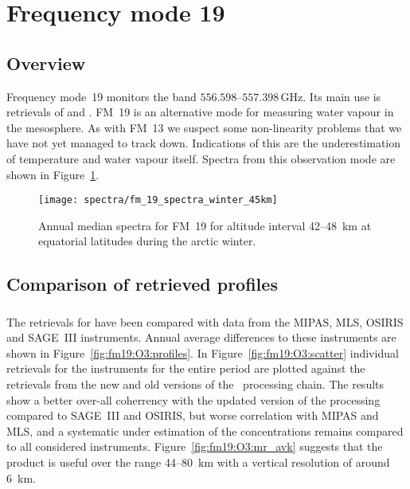 \section{Frequency mode 19}
\label{sec:fm19}

\subsection{Overview}
\label{sec:fm19:overview}
Frequency mode~19 monitors the band $556.598$--$557.398\,\mathrm{GHz}$. Its
main use is retrievals of  and .
FM~19 is an alternative mode for measuring water vapour in the mesosphere. As
with FM~13 we suspect some non-linearity problems that we have not yet managed
to track down.  Indications of this are the underestimation of temperature and
water vapour itself.
Spectra from this observation mode are shown in Figure~\ref{fig:spectra:19}.

\begin{figure}[ht]
    \centering
    \texttt{[image: spectra/fm\_19\_spectra\_winter\_45km]}
    \caption{Annual median spectra for FM~19 for altitude interval 42--48~km at
        equatorial latitudes during the arctic winter.
    }\label{fig:spectra:19}
\end{figure}


\subsection{Comparison of retrieved profiles}
\label{sec:fm19:comparison}



\subsubsection{}
\label{sec:fm19:comparison:O3}
The retrievals for  have been compared with data from the MIPAS, MLS,
OSIRIS and SAGE~III instruments. Annual average differences to these
instruments are shown in Figure~\ref{fig:fm19:O3:profiles}. In
Figure~\ref{fig:fm19:O3:scatter} individual retrievals for the instruments for
the entire period are plotted against the retrievals from the new and old
versions of the \smr\ processing chain. The results show a better over-all
coherrency with the updated version of the processing compared to SAGE~III and
OSIRIS, but worse correlation with MIPAS and MLS, and a systematic under
estimation of the concentrations remains compared to all considered
instruments.
Figure~\ref{fig:fm19:O3:mr_avk} suggests that the product is useful over the
range 44--80~km with a vertical resolution of around 6~km.


